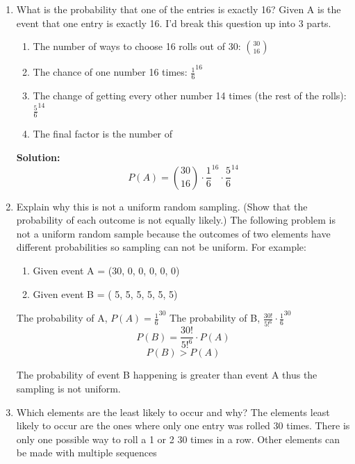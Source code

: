 \documentclass{article}
\begin{document}
\begin{enumerate}
\begin{enumerate}
        \item What is the probability that one of the entries is exactly 16?
        Given A is the event that one entry is exactly 16. I'd break this question up into 3 parts.
        \begin{enumerate}
            \item The number of ways to choose 16 rolls out of 30: $\binom{30}{16}$
            \item The chance of one number 16 times: $ \frac{1}{6}^{16} $
            \item The change of getting every other number 14 times (the rest of the rolls): $ \frac{5}{6}^{14} $
            \item The final factor is the number of  
        \end{enumerate}
            \textbf{Solution:} 
        \[ P(A) = \binom{30}{16} \cdot \frac{1}{6}^{16} \cdot  \frac{5}{6}^{14} \]
        \item Explain why this is not a uniform random sampling. (Show that the probability of each outcome is not equally likely.)
        The following problem is not a uniform random sample because the outcomes of two elements have different probabilities so sampling can not be uniform.
        For example: 
        \begin{enumerate}
            \item Given event A = (30, 0, 0, 0, 0, 0)
            \item Given event B = ( 5, 5, 5, 5, 5, 5)
        \end{enumerate}
        The probability of A, $ P(A) = \frac{1}{6}^{30}$
        The probability of B, $ \frac{30!}{5!^{6}} \cdot \frac{1}{6}^{30}$
        \[ P(B) = \frac{30!}{5!^{6}} \cdot P(A)\]
        \[ P(B) > P(A) \]    

        The probability of event B happening is greater than event A thus the sampling is not uniform.

        \item Which elements are the least likely to occur and why?
        The elements least likely to occur are the ones where only one entry was rolled 30 times. There is only one possible way to roll a 1 or 2 30 times in a row. Other elements can be made with multiple sequences


\end{enumerate}
\end{enumerate}
\end{document}
